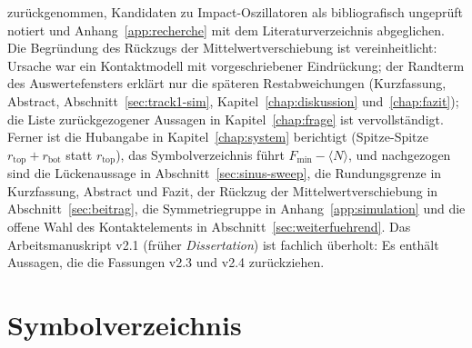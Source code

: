 \documentclass[12pt,a4paper]{report}
\begin{document}
zurückgenommen, Kandidaten zu Impact-Oszillatoren als bibliografisch
ungeprüft notiert und Anhang~\ref{app:recherche} mit dem
Literaturverzeichnis abgeglichen. Die Begründung des Rückzugs der
Mittelwertverschiebung ist vereinheitlicht: Ursache war ein Kontaktmodell
mit vorgeschriebener Eindrückung; der Randterm des Auswertefensters
erklärt nur die späteren Restabweichungen (Kurzfassung, Abstract,
Abschnitt~\ref{sec:track1-sim}, Kapitel~\ref{chap:diskussion}
und~\ref{chap:fazit}); die Liste zurückgezogener Aussagen in
Kapitel~\ref{chap:frage} ist vervollständigt. Ferner ist die Hubangabe in
Kapitel~\ref{chap:system} berichtigt (Spitze-Spitze
$r_{\mathrm{top}} + r_{\mathrm{bot}}$ statt $r_{\mathrm{top}}$), das
Symbolverzeichnis führt $F_{\min} - \langle N \rangle$, und nachgezogen
sind die Lückenaussage in Abschnitt~\ref{sec:sinus-sweep}, die
Rundungsgrenze in Kurzfassung, Abstract und Fazit, der Rückzug der
Mittelwertverschiebung in Abschnitt~\ref{sec:beitrag}, die
Symmetriegruppe in Anhang~\ref{app:simulation} und die offene Wahl des
Kontaktelements in Abschnitt~\ref{sec:weiterfuehrend}. Das Arbeitsmanuskript v2.1 (früher
\emph{Dissertation}) ist fachlich überholt: Es enthält Aussagen, die die
Fassungen v2.3 und v2.4 zurückziehen.

\clearpage

\chapter*{Symbolverzeichnis}
\end{document}
